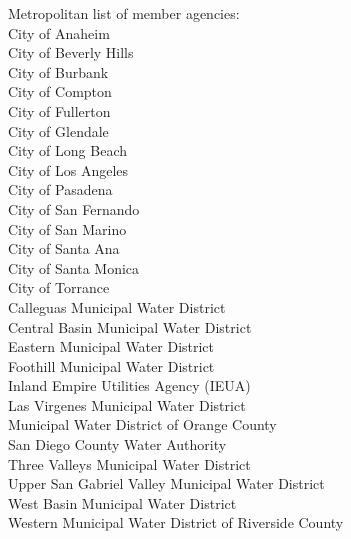 \documentclass{article}
\begin{document}
Metropolitan list of member agencies:\\
City of Anaheim\\
City of Beverly Hills\\
City of Burbank\\
City of Compton\\
City of Fullerton\\
City of Glendale\\
City of Long Beach\\
City of Los Angeles\\
City of Pasadena\\
City of San Fernando\\
City of San Marino\\
City of Santa Ana\\
City of Santa Monica\\
City of Torrance\\
Calleguas Municipal Water District\\
Central Basin Municipal Water District\\
Eastern Municipal Water District\\
Foothill Municipal Water District\\
Inland Empire Utilities Agency (IEUA)\\
Las Virgenes Municipal Water District\\
Municipal Water District of Orange County\\
San Diego County Water Authority\\
Three Valleys Municipal Water District\\
Upper San Gabriel Valley Municipal Water District\\
West Basin Municipal Water District\\
Western Municipal Water District of Riverside County\\
\end{document}
